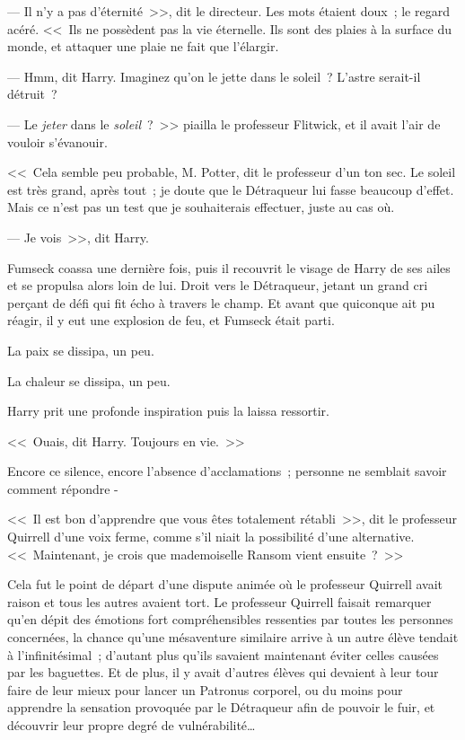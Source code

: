 --- Il n'y a pas d'éternité~>>, dit le directeur. Les mots étaient doux~; le regard acéré. <<~Ils ne possèdent pas la vie éternelle. Ils sont des plaies à la surface du monde, et attaquer une plaie ne fait que l'élargir.

--- Hmm, dit Harry. Imaginez qu'on le jette dans le soleil~? L'astre serait-il détruit~?

--- Le \emph{jeter} dans le \emph{soleil}~?~>> piailla le professeur Flitwick, et il avait l'air de vouloir s'évanouir.

<<~Cela semble peu probable, M. Potter, dit le professeur d'un ton sec. Le soleil est très grand, après tout~; je doute que le Détraqueur lui fasse beaucoup d'effet. Mais ce n'est pas un test que je souhaiterais effectuer, juste au cas où.

--- Je vois~>>, dit Harry.

Fumseck coassa une dernière fois, puis il recouvrit le visage de Harry de ses ailes et se propulsa alors loin de lui. Droit vers le Détraqueur, jetant un grand cri perçant de défi qui fit écho à travers le champ. Et avant que quiconque ait pu réagir, il y eut une explosion de feu, et Fumseck était parti.

La paix se dissipa, un peu.

La chaleur se dissipa, un peu.

Harry prit une profonde inspiration puis la laissa ressortir.

<<~Ouais, dit Harry. Toujours en vie.~>>

Encore ce silence, encore l'absence d'acclamations~; personne ne semblait savoir comment répondre -

<<~Il est bon d'apprendre que vous êtes totalement rétabli~>>, dit le professeur Quirrell d'une voix ferme, comme s'il niait la possibilité d'une alternative. <<~Maintenant, je crois que mademoiselle Ransom vient ensuite~?~>>

Cela fut le point de départ d'une dispute animée où le professeur Quirrell avait raison et tous les autres avaient tort. Le professeur Quirrell faisait remarquer qu'en dépit des émotions fort compréhensibles ressenties par toutes les personnes concernées, la chance qu'une mésaventure similaire arrive à un autre élève tendait à l'infinitésimal~; d'autant plus qu'ils savaient maintenant éviter celles causées par les baguettes. Et de plus, il y avait d'autres élèves qui devaient à leur tour faire de leur mieux pour lancer un Patronus corporel, ou du moins pour apprendre la sensation provoquée par le Détraqueur afin de pouvoir le fuir, et découvrir leur propre degré de vulnérabilité…

